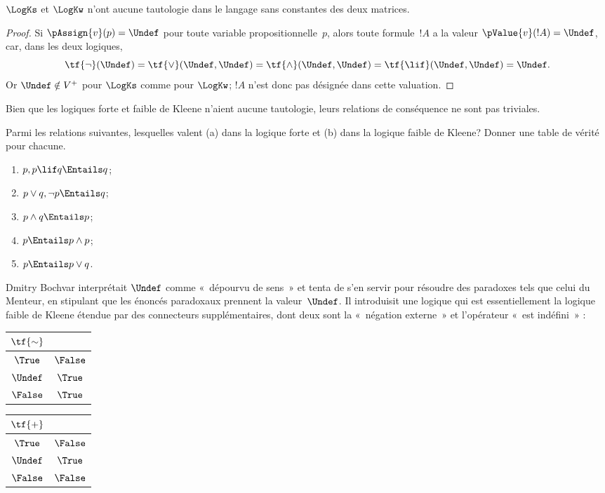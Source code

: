 \documentclass[../../../include/open-logic-section]{subfiles}
\begin{document}
\begin{prop}
  $\LogKs$ et $\LogKw$ n'ont aucune tautologie dans le langage sans
  constantes des deux matrices.
\end{prop}

\begin{proof}
  Si $\pAssign{v}(p)=\Undef$ pour
  toute variable propositionnelle~$p$,
  alors toute formule~$!A$ a la
  valeur $\pValue{v}(!A)=\Undef$,
  car, dans les deux logiques,
  \[
    \tf{\lnot}(\Undef)
    =\tf{\lor}(\Undef,\Undef)
    =\tf{\land}(\Undef,\Undef)
    =\tf{\lif}(\Undef,\Undef)
    =\Undef.
  \]
  Or $\Undef\notin V^+$ pour
  $\LogKs$ comme pour $\LogKw$;
  $!A$ n'est donc pas désignée
  dans cette valuation.
\end{proof}

Bien que les logiques forte et faible
de Kleene n'aient aucune tautologie,
leurs relations de conséquence ne
sont pas triviales.

\begin{prob}
  Parmi les relations suivantes,
  lesquelles valent (a) dans la logique
  forte et (b) dans la logique faible
  de Kleene? Donner une table de vérité
  pour chacune.
  \begin{enumerate}
    \item $p,p\lif q\Entails q$;
    \item $p\lor q,\lnot p\Entails q$;
    \item $p\land q\Entails p$;
    \item $p\Entails p\land p$;
    \item $p\Entails p\lor q$.
  \end{enumerate}
\end{prob}

Dmitry Bochvar interprétait $\Undef$
comme «~dépourvu de sens~» et tenta
de s'en servir pour résoudre des
paradoxes tels que celui du Menteur,
en stipulant que les énoncés
paradoxaux prennent la valeur~$\Undef$.
Il introduisit une logique qui est
essentiellement la logique faible de
Kleene étendue par des connecteurs
supplémentaires, dont deux sont la
«~négation externe~» et l'opérateur
«~est indéfini~» :
\begin{center}
  \begin{tabular}{c|c}
    $\tf{\sim}$ & \\
    \hline
    $\True$ & $\False$ \\
    $\Undef$ & $\True$ \\
    $\False$ & $\True$
  \end{tabular}
  \quad
  \begin{tabular}{c|c}
    $\tf{+}$ & \\
    \hline
    $\True$ & $\False$ \\
    $\Undef$ & $\True$ \\
    $\False$ & $\False$
  \end{tabular}
\end{center}
\end{document}
